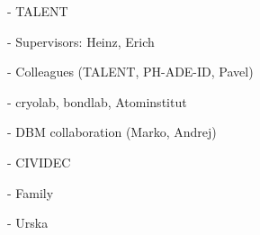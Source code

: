 \acknowledgement

- TALENT

- Supervisors: Heinz, Erich

- Colleagues (TALENT, PH-ADE-ID, Pavel)

- cryolab, bondlab, Atominstitut

- DBM collaboration (Marko, Andrej)

- CIVIDEC

- Family

- Urska
